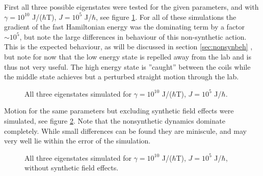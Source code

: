\documentclass[main.tex]{subfiles}
\begin{document}
First all three possible eigenstates were tested for the given parameters, and with
\(\gamma = 10^{10}\) J/(\(\hbar{}\)T), \(J = 10^5\) J/\(\hbar{}\), see figure
\ref{fig:ncompare}. For all of these simulations the gradient of the fast Hamiltonian
energy was the dominating term by a factor \(\sim 10^{5}\), but note the large differences
in behaviour of this non-synthetic action. This is the expected behaviour, as will be discussed in
section \ref{sec:nonsynbeh}
, but note for now that the low energy state is repelled away from the lab and is thus not
very useful. The high energy state is ''caught'' between the coils while the middle state
achieves but a perturbed straight motion through the lab.
\begin{figure}[h]
    \centering
    \qquad
    \qquad
    \caption{\centering All three eigenstates simulated for \(\gamma = 10^{10}\)
            J/(\(\hbar{}\)T), \(J = 10^5\)
    J/\(\hbar{}\).}%
    \label{fig:ncompare}
\end{figure}
Motion for the same parameters but excluding synthetic field effects were simulated, see
figure \ref{fig:ncompare_nosyn}. Note that the nonsynthetic dynamics dominate completely.
While small differences can be found they are miniscule, and may very well lie within the
error of the simulation.
\begin{figure}[h]
    \centering
    \qquad
    \qquad
    \caption{All three eigenstates simulated for \(\gamma = 10^{10}\) J/(\(\hbar{}\)T), \(J = 10^5\)
    J/\(\hbar{}\), without synthetic field effects.}%
    \label{fig:ncompare_nosyn}
\end{figure}
\end{document}
